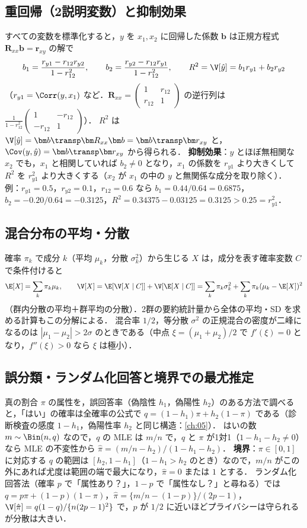\subsection{重回帰（2説明変数）と抑制効果}\label{subsec:G-reg}
すべての変数を標準化すると，$y$ を $x_1,x_2$ に回帰した係数 $\bm b$ は正規方程式 $\bm R_{xx}\bm b=\bm r_{xy}$ の解で
\[
b_1=\frac{r_{y1}-r_{12}r_{y2}}{1-r_{12}^2},\qquad b_2=\frac{r_{y2}-r_{12}r_{y1}}{1-r_{12}^2},\qquad R^2=\V[\hat y]=b_1r_{y1}+b_2r_{y2}
\]
（$r_{y1}=\Corr(y,x_1)$ など．$\bm R_{xx}=\begin{pmatrix}1&r_{12}\\r_{12}&1\end{pmatrix}$ の逆行列は $\frac1{1-r_{12}^2}\begin{pmatrix}1&-r_{12}\\-r_{12}&1\end{pmatrix}$）．
$R^2$ は $\V[\hat y]=\bm b\transp\bm R_{xx}\bm b=\bm b\transp\bm r_{xy}$ と，$\Cov(y,\hat y)=\bm b\transp\bm r_{xy}$ から得られる．
\textbf{抑制効果}：$y$ とほぼ無相関な $x_2$ でも，$x_1$ と相関していれば $b_2\ne0$ となり，$x_1$ の係数を $r_{y1}$ より大きくして $R^2$ を $r_{y1}^2$ より大きくする（$x_2$ が $x_1$ の中の $y$ と無関係な成分を取り除く）．
例：$r_{y1}=0.5$，$r_{y2}=0.1$，$r_{12}=0.6$ なら $b_1=0.44/0.64=0.6875$，$b_2=-0.20/0.64=-0.3125$，$R^2=0.34375-0.03125=0.3125>0.25=r_{y1}^2$．

\subsection{混合分布の平均・分散}\label{subsec:G-mixture}
確率 $\pi_k$ で成分 $k$（平均 $\mu_k$，分散 $\sigma_k^2$）から生じる $X$ は，成分を表す確率変数 $C$ で条件付けると
\[
\E[X]=\sum_k\pi_k\mu_k,\qquad \V[X]=\E[\V[X\mid C]]+\V[\E[X\mid C]]=\sum_k\pi_k\sigma_k^2+\sum_k\pi_k(\mu_k-\E[X])^2
\]
（群内分散の平均＋群平均の分散）．2群の要約統計量から全体の平均・SD を求める計算もこの分解による．
混合率 $1/2$，等分散 $\sigma^2$ の正規混合の密度が二峰になるのは $|\mu_1-\mu_2|>2\sigma$ のときである（中点 $\xi=(\mu_1+\mu_2)/2$ で $f'(\xi)=0$ となり，$f''(\xi)>0$ なら $\xi$ は極小）．

\subsection{誤分類・ランダム化回答と境界での最尤推定}\label{subsec:G-rr}
真の割合 $\pi$ の属性を，誤回答率（偽陰性 $h_1$，偽陽性 $h_2$）のある方法で調べると，「はい」の確率は全確率の公式で $q=(1-h_1)\pi+h_2(1-\pi)$ である（診断検査の感度 $1-h_1$，偽陽性率 $h_2$ と同じ構造：\cref{ch:05}）．
はいの数 $m\sim\Bin(n,q)$ なので，$q$ の MLE は $m/n$ で，$q$ と $\pi$ が1対1（$1-h_1-h_2\ne0$）なら MLE の不変性から
$\hat\pi=(m/n-h_2)/(1-h_1-h_2)$．
\textbf{境界}：$\pi\in[0,1]$ に対応する $q$ の範囲は $[h_2,1-h_1]$（$1-h_1>h_2$ のとき）なので，$m/n$ がこの外にあれば尤度は範囲の端で最大になり，$\hat\pi=0$ または $1$ とする．
ランダム化回答法（確率 $p$ で「属性あり？」，$1-p$ で「属性なし？」と尋ねる）では $q=p\pi+(1-p)(1-\pi)$，$\hat\pi=\{m/n-(1-p)\}/(2p-1)$，
$\V[\hat\pi]=q(1-q)/\{n(2p-1)^2\}$ で，$p$ が $1/2$ に近いほどプライバシーは守られるが分散は大きい．

